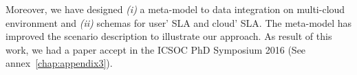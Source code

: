 
Moreover, we have designed \textit{(i)} a meta-model to data integration on multi-cloud environment and \textit{(ii)} schemas for user' SLA and cloud' SLA.
The meta-model has improved the scenario description to illustrate our approach.
As result of this work, we had a paper accept in the ICSOC PhD Symposium 2016 (See annex~\ref{chap:appendix3}).


